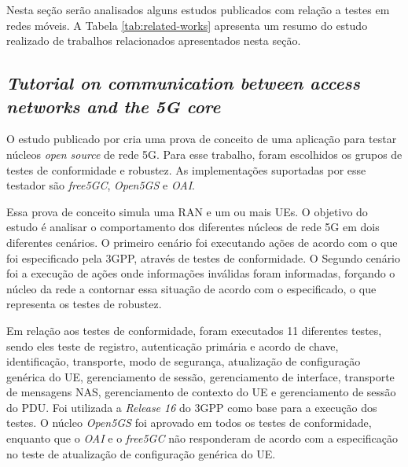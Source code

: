 Nesta seção serão analisados alguns estudos publicados com relação a testes em redes móveis.
A Tabela \ref{tab:related-works} apresenta um resumo do estudo realizado de trabalhos relacionados apresentados nesta seção.

\subsection{\textit{Tutorial on communication between access networks and the 5G core}}

O estudo publicado por \cite{Dominato2021} cria uma prova de conceito de uma aplicação para testar núcleos \textit{open source} de rede 5G.
Para esse trabalho, foram escolhidos os grupos de testes de conformidade e robustez.
As implementações suportadas por esse testador são \textit{free5GC}, \textit{Open5GS} e \textit{OAI}.

Essa prova de conceito simula uma RAN e um ou mais UEs.
O objetivo do estudo é analisar o comportamento dos diferentes núcleos de rede 5G em dois diferentes cenários. O primeiro cenário foi executando ações de acordo com o que foi especificado pela 3GPP, através de testes de conformidade. O Segundo cenário foi a execução de ações onde informações inválidas foram informadas, forçando o núcleo da rede a contornar essa situação de acordo com o especificado, o que representa os testes de robustez.

Em relação aos testes de conformidade, foram executados 11 diferentes testes, sendo eles teste de registro, autenticação primária e acordo de chave, identificação, transporte, modo de segurança, atualização de configuração genérica do UE, gerenciamento de sessão, gerenciamento de interface, transporte de mensagens NAS, gerenciamento de contexto do UE e gerenciamento de sessão do PDU.
Foi utilizada a \textit{Release 16} do 3GPP como base para a execução dos testes.
O núcleo \textit{Open5GS} foi aprovado em todos os testes de conformidade, enquanto que o \textit{OAI} e o \textit{free5GC} não responderam de acordo com a especificação no teste de atualização de configuração genérica do UE.


